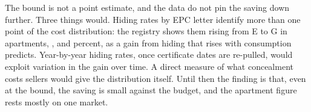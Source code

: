 The bound is not a point estimate, and the data do not pin the saving down further. Three things would. Hiding rates by EPC letter identify more than one point of the cost distribution: the registry shows them rising from E to G in apartments, \attHideLetterEApt{}, \attHideLetterFApt{} and \attHideLetterGApt{} percent, as a gain from hiding that rises with consumption predicts. Year-by-year hiding rates, once certificate dates are re-pulled, would exploit variation in the gain over time. A direct measure of what concealment costs sellers would give the distribution itself. Until then the finding is that, even at the bound, the saving is small against the budget, and the apartment figure rests mostly on one market.
